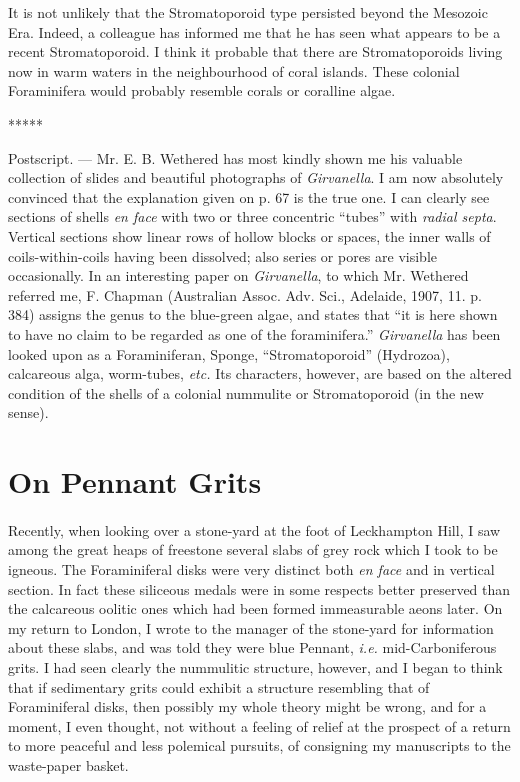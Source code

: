 \documentclass[a4paper, 12pt, oneside]{article}
\begin{document}
It is not unlikely that the Stromatoporoid type persisted beyond the Mesozoic Era. Indeed, a colleague has informed me that he has seen what appears to be a recent Stromatoporoid. I think it probable that there are Stromatoporoids living now in warm waters in the neighbourhood of coral islands. These colonial Foraminifera would probably resemble corals or coralline algae.

\centerline{*\hspace{15mm}*\hspace{15mm}*\hspace{15mm}*\hspace{15mm}*}
\bigskip

\small
{Postscript.} --- Mr. E. B. Wethered has most kindly shown me his valuable collection of slides and beautiful photographs of \emph{Girvanella}. I am now absolutely convinced that the explanation given on p. 67 is the true one. I can clearly see sections of shells \emph{en face} with two or three concentric ``tubes'' with \emph{radial septa}. Vertical sections show linear rows of hollow blocks or spaces, the inner walls of coils-within-coils having been dissolved; also series or pores are visible occasionally. In an interesting paper on \emph{Girvanella}, to which Mr. Wethered referred me, F. Chapman (Australian Assoc. Adv. Sci., Adelaide, 1907, 11. p. 384) assigns the genus to the blue-green algae, and states that ``it is here shown to have no claim to be regarded as one of the foraminifera.'' \emph{Girvanella} has been looked upon as a Foraminiferan, Sponge, ``Stromatoporoid'' (Hydrozoa), calcareous alga, worm-tubes, \emph{etc.} Its characters, however, are based on the altered condition of the shells of a colonial nummulite or Stromatoporoid (in the new sense).
\normalsize
\clearpage
\section{On Pennant Grits}
\paragraph{}
Recently, when looking over a stone-yard at the foot of Leckhampton Hill, I saw among the great heaps of freestone several slabs of grey rock which I took to be igneous. The Foraminiferal disks were very distinct both \emph{en face} and in vertical section. In fact these siliceous medals were in some respects better preserved than the calcareous oolitic ones which had been formed immeasurable aeons later. On my return to London, I wrote to the manager of the stone-yard for information about these slabs, and was told they were blue Pennant, \emph{i.e.} mid-Carboniferous grits. I had seen clearly the nummulitic structure, however, and I began to think that if sedimentary grits could exhibit a structure resembling that of Foraminiferal disks, then possibly my whole theory might be wrong, and for a moment, I even thought, not without a feeling of relief at the prospect of a return to more peaceful and less polemical pursuits, of consigning my manuscripts to the waste-paper basket.
\end{document}
